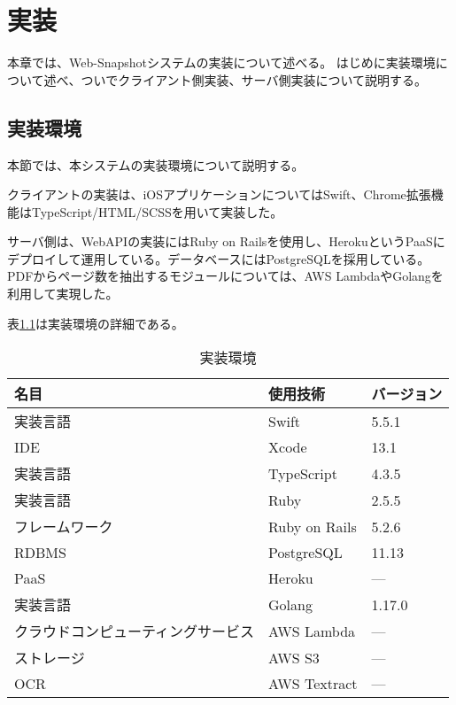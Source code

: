 \chapter{実装}
\label{chap:implementation}
本章では、Web-Snapshotシステムの実装について述べる。
はじめに実装環境について述べ、ついでクライアント側実装、サーバ側実装について説明する。

\section{実装環境}
本節では、本システムの実装環境について説明する。

クライアントの実装は、iOSアプリケーションについてはSwift、Chrome拡張機能はTypeScript/HTML/SCSSを用いて実装した。

サーバ側は、WebAPIの実装にはRuby on Railsを使用し、Heroku\cite{heroku}というPaaSにデプロイして運用している。データベースにはPostgreSQLを採用している。
PDFからページ数を抽出するモジュールについては、AWS Lambda\cite{lambda}やGolangを利用して実現した。

表\ref{tb:implementation-env}は実装環境の詳細である。

\begin{table}[htbp]
  \label{tb:implementation-env}
  \caption{実装環境}
  \begin{center}
    \begin{tabular}{|l|l|l|}
    \hline
    名目 & 使用技術 & バージョン \\ \hline
    実装言語 & Swift & 5.5.1 \\ \hline
    IDE & Xcode & 13.1 \\ \hline
    実装言語 & TypeScript & 4.3.5 \\ \hline
    実装言語 & Ruby & 2.5.5 \\ \hline
    フレームワーク & Ruby on Rails & 5.2.6 \\ \hline
    RDBMS & PostgreSQL & 11.13 \\ \hline
    PaaS & Heroku & --- \\ \hline
    実装言語 & Golang & 1.17.0 \\ \hline
    クラウドコンピューティングサービス & AWS Lambda & --- \\ \hline
    ストレージ & AWS S3 & --- \\ \hline
    OCR & AWS Textract\cite{textract} & --- \\ \hline
    \end{tabular}
  \end{center}
\end{table}




